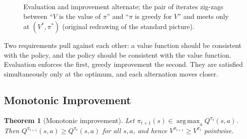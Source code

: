 \documentclass[11pt,a4paper]{article}
\DeclareMathOperator*{\argmax}{arg\,max}
\theoremstyle{plain}
\newtheorem{theorem}{Theorem}[section]
\theoremstyle{definition}
\theoremstyle{remark}
\begin{document}
\begin{figure}[h]
\centering
{}
\caption{Evaluation and improvement alternate; the pair of iterates zig-zags between ``$V$ is the value of $\pi$'' and ``$\pi$ is greedy for $V$'' and meets only at $(V^*,\pi^*)$ (original redrawing of the standard picture).}
\end{figure}

\begin{intuition}
Two requirements pull against each other: a value function should be consistent with the policy, and the policy should be consistent with the value function. Evaluation enforces the first, greedy improvement the second. They are satisfied simultaneously only at the optimum, and each alternation moves closer.
\end{intuition}

\subsection{Monotonic Improvement}
\begin{theorem}[Monotonic improvement]\label{thm:mono}
Let $\pi_{t+1}(s)\in\argmax_aQ^{\pi_t}(s,a)$. Then $Q^{\pi_{t+1}}(s,a)\ge Q^{\pi_t}(s,a)$ for all $s,a$, and hence $V^{\pi_{t+1}}\ge V^{\pi_t}$ pointwise.
\end{theorem}
\end{document}
